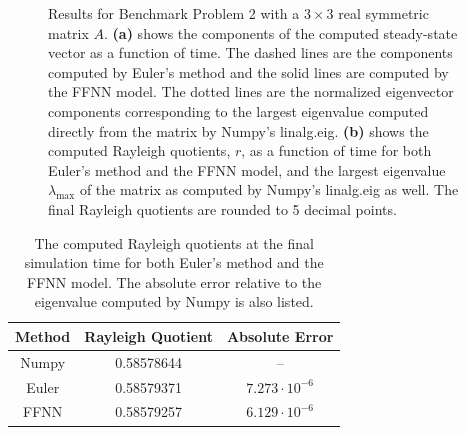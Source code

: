 \begin{figure}[H]
\centering
{}
\qquad
{}
\caption{Results for Benchmark Problem 2 with a $3\times 3$ real symmetric matrix $A$. \textbf{(a)} shows the components of the computed steady-state vector as a function of time. The dashed lines are the components computed by Euler's method and the solid lines are computed by the FFNN model. The dotted lines are the normalized eigenvector components corresponding to the largest eigenvalue computed directly from the matrix by Numpy's linalg.eig. \textbf{(b)} shows the computed Rayleigh quotients, $r$, as a function of time for both Euler's method and the FFNN model, and the largest eigenvalue $\lambda_\mathrm{max}$ of the matrix as computed by Numpy's linalg.eig as well. The final Rayleigh quotients are rounded to 5 decimal points.}
\label{fig:benchrun2}
\end{figure}

\begin{table}[H]
\caption{The computed Rayleigh quotients at the final simulation time for both Euler's method and the FFNN model. The absolute error relative to the eigenvalue computed by Numpy is also listed.}
\centering
{}
\begin{tabular}{c|c|c}
\hline
\hline 
Method & Rayleigh Quotient & Absolute Error
\\
\hline 
\hline 
Numpy & 0.58578644 & –
\\
Euler & 0.58579371 & $7.273 \cdot 10^{-6}$  
\\
FFNN & 0.58579257 & $6.129 \cdot 10^{-6}$
\\
\hline
\hline 
\end{tabular}
\label{tab:eigbench2}
\end{table}

